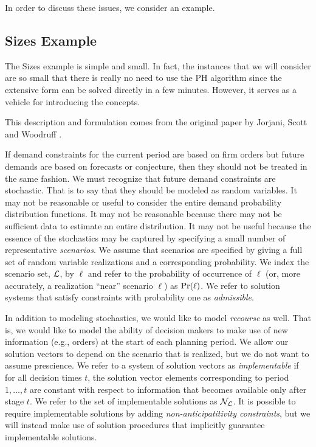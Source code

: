 In order to discuss these issues, we consider an example.

\subsection{Sizes Example}

The Sizes example is simple and small. In fact, the instances that we will consider are so small that there is really
no need to use the PH algorithm since the extensive form can be solved directly in a few minutes. However, it serves as a 
vehicle for introducing the concepts.

This description and formulation comes from the original paper by Jorjani, Scott and Woodruff \cite{sizes}.

If demand constraints for the current period are
based on firm orders but future demands are based on forecasts or
conjecture, then they should not be treated in the same fashion. We
must recognize that future demand constraints are stochastic. That is
to say that they should be modeled as random variables.
It may not be reasonable or useful to consider the entire demand probability 
distribution functions. It may not be reasonable because there may not be 
sufficient data to estimate an entire distribution. It may not be useful
because the essence of the stochastics may be captured by specifying a 
small number of representative {\em scenarios}. We assume that scenarios 
are specified by giving a full set of random variable realizations and a 
corresponding probability. 
We index the scenario set, ${\cal L}$, by $\ell$ and 
refer to the probability of occurrence of $\ell$ (or, more accurately, a 
realization ``near'' scenario $\ell$) as $\mbox{Pr}(\ell)$.
We refer to solution systems that satisfy constraints with probability one as 
{\em admissible}. 

In addition to modeling stochastics, we would like to model {\em
recourse} as well. That is, we would like to model the ability of
decision makers to make use of new information (e.g., orders) at the
start of each planning period.  We allow our solution vectors to
depend on the scenario that is realized, but we do not want to assume
prescience. We refer to a system of solution vectors as {\em
implementable} if for all decision times $t$, the solution vector
elements corresponding to period $1,\ldots,t$ are constant with
respect to information that becomes available only after stage $t$. 
We refer to the set of implementable solutions as ${\cal N}_{\cal L}$.  It is
possible to require implementable solutions by adding {\em
non-anticipatitivity constraints}, but we will instead make use of
solution procedures that implicitly guarantee implementable solutions.

